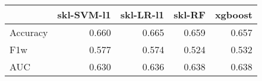 \begin{tabular}{lrrrr}
\toprule
{} &  skl-SVM-l1 &  skl-LR-l1 &  skl-RF &  xgboost \\
\midrule
Accuracy &       0.660 &      0.665 &   0.659 &    0.657 \\
F1w      &       0.577 &      0.574 &   0.524 &    0.532 \\
AUC      &       0.630 &      0.636 &   0.638 &    0.638 \\
\bottomrule
\end{tabular}
